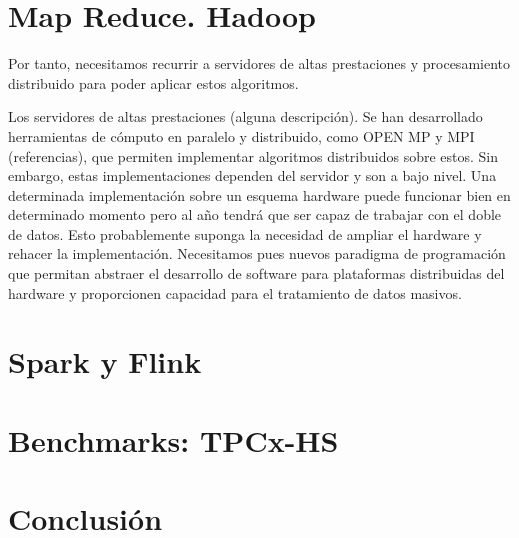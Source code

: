 \documentclass{article}
\begin{document}
\section{Map Reduce. Hadoop} \label{sec:map-reduce}

	Por tanto, necesitamos recurrir a servidores de altas prestaciones y procesamiento distribuido para poder aplicar estos algoritmos.
	
	Los servidores de altas prestaciones (alguna descripción). Se han desarrollado herramientas de cómputo en paralelo y distribuido, como OPEN MP y MPI (referencias), que permiten implementar algoritmos distribuidos sobre estos. Sin embargo, estas implementaciones dependen del servidor y son a bajo nivel. Una determinada implementación sobre un esquema hardware puede funcionar bien en determinado momento pero al año tendrá que ser capaz de trabajar con el doble de datos. Esto probablemente suponga la necesidad de ampliar el hardware y rehacer la implementación. Necesitamos pues nuevos paradigma de programación que permitan abstraer el desarrollo de software para plataformas distribuidas del hardware y proporcionen capacidad para el tratamiento de datos masivos.



\section{Spark y Flink} \label{sec:spark-flink}



\section{Benchmarks: TPCx-HS} \label{sec:tpcx-hs}


\section{Conclusión} \label{sec:conclusion}


\printbibliography
\end{document}
